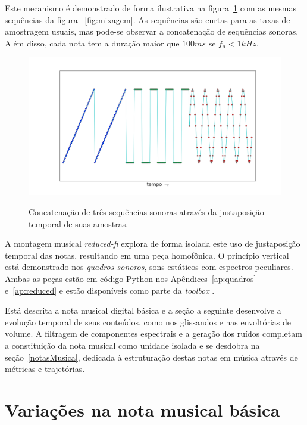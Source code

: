Este mecanismo é demonstrado de forma ilustrativa na figura~\ref{fig:concatenacao} com as mesmas sequências da figura ~\ref{fig:mixagem}.
 As sequências são curtas para as taxas de amostragem usuais, mas pode-se observar a concatenação de sequências sonoras. Além disso, cada nota tem a duração maior que $100ms$ se $f_a<1kHz$.

\begin{figure}[h!]
{    \centering
        \includegraphics[width=\textwidth]{figuras/concatenacao}}
    \caption{Concatenação de três sequências sonoras através da justaposição temporal de suas amostras.}
        \label{fig:concatenacao}
\end{figure}

A montagem musical \emph{reduced-fi} explora de forma isolada este uso de justaposição temporal das notas, resultando em uma peça homofônica. O princípio vertical está demonstrado nos \emph{quadros sonoros}, sons estáticos com espectros peculiares. Ambas as peças estão em código Python nos Apêndices~\ref{ap:quadros} e~\ref{ap:reduced} e estão disponíveis como parte da \emph{toolbox} \massa.\cite{MASSA}

Está descrita a nota musical digital básica e a seção a seguinte desenvolve a evolução temporal de seus conteúdos, como nos glissandos e nas envoltórias de volume. A filtragem de componentes espectrais e a geração dos ruídos completam a constituição da nota musical como unidade isolada e se desdobra na seção~\ref{notasMusica}, dedicada à estruturação destas notas em música através de métricas e trajetórias.




\clearpage

\section{Variações na nota musical básica}\label{varInternas}


